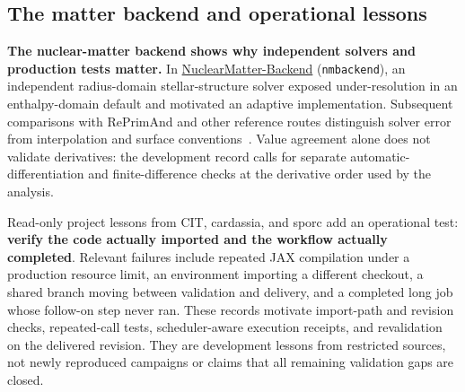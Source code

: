 \documentclass[aps,prd,reprint,nofootinbib]{revtex4-2}
\begin{document}
\subsection{The matter backend and operational lessons}
\textbf{The nuclear-matter backend shows why independent solvers and production tests matter.} In \href{https://github.com/oshaughnessy-junior/NuclearMatter-Backend}{NuclearMatter-Backend} (\texttt{nmbackend}), an independent radius-domain stellar-structure solver exposed under-resolution in an enthalpy-domain default and motivated an adaptive implementation. Subsequent comparisons with RePrimAnd and other reference routes distinguish solver error from interpolation and surface conventions~\cite{MatterBackend}. Value agreement alone does not validate derivatives: the development record calls for separate automatic-differentiation and finite-difference checks at the derivative order used by the analysis.

Read-only project lessons from CIT, cardassia, and sporc add an operational test: \textbf{verify the code actually imported and the workflow actually completed}. Relevant failures include repeated JAX compilation under a production resource limit, an environment importing a different checkout, a shared branch moving between validation and delivery, and a completed long job whose follow-on step never ran. These records motivate import-path and revision checks, repeated-call tests, scheduler-aware execution receipts, and revalidation on the delivered revision. They are development lessons from restricted sources, not newly reproduced campaigns or claims that all remaining validation gaps are closed.
\end{document}
